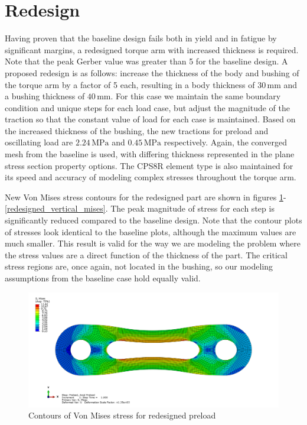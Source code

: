 \documentclass[../main.tex]{subfiles}
\begin{document}
\section{Redesign}

Having proven that the baseline design fails both in yield and in fatigue by significant margins, a redesigned torque arm with increased thickness is required.
Note that the peak Gerber value was greater than 5 for the baseline design.
A proposed redesign is as follows: increase the thickness of the body and bushing of the torque arm by a factor of 5 each, resulting in a body thickness of \(30\,\unit{\milli\meter}\) and a bushing thickness of \(40\,\unit{\milli\meter}\).
For this case we maintain the same boundary condition and unique steps for each load case, but adjust the magnitude of the traction so that the constant value of load for each case is maintained.
Based on the increased thickness of the bushing, the new tractions for preload and oscillating load are \(2.24\,\unit{\mega\pascal}\) and \(0.45\,\unit{\mega\pascal}\) respectively.
Again, the converged mesh from the baseline is used, with differing thickness represented in the plane stress section property options.
The CPS8R element type is also maintained for its speed and accuracy of modeling complex stresses throughout the torque arm. 

New Von Mises stress contours for the redesigned part are shown in figures \ref{redesigned_axial_mises}-\ref{redesigned_vertical_mises}.
The peak magnitude of stress for each step is significantly reduced compared to the baseline design. 
Note that the contour plots of stresses look identical to the baseline plots, although the maximum values are much smaller.
This result is valid for the way we are modeling the problem where the stress values are a direct function of the thickness of the part.
The critical stress regions are, once again, not located in the bushing, so our modeling assumptions from the baseline case hold equally valid.

\begin{figure}[H]
    \centering
    \includegraphics[scale=0.2]{../../images/40bush_30body_axial_mises.png}
    \caption{Contours of Von Mises stress for redesigned preload}
    \label{redesigned_axial_mises}
\end{figure}
\end{document}
